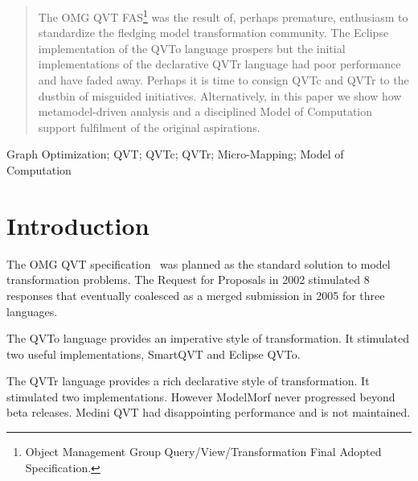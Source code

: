 \documentclass[conference]{IEEEtran}
\begin{document}
\begin{abstract}
The OMG QVT FAS\footnote{Object Management Group Query/View/Transformation Final Adopted Specification.} was the result of, perhaps premature, enthusiasm to standardize the fledging model transformation community. The Eclipse implementation of the QVTo language prospers but the initial implementations of the declarative QVTr language had poor performance and have faded away. Perhaps it is time to consign QVTc and QVTr to the dustbin of misguided initiatives. Alternatively, in this paper we show how metamodel-driven analysis and a disciplined Model of Computation support fulfilment of the original aspirations.
\end{abstract}

\begin{IEEEkeywords}
Graph Optimization; QVT; QVTc; QVTr; Micro-Mapping; Model of Computation
\end{IEEEkeywords}



%
\IEEEpeerreviewmaketitle



\section{Introduction}

The OMG QVT specification~\cite{QVT-1.3} was planned as the standard solution to model transformation problems. The Request for Proposals in 2002 stimulated 8 responses that eventually coalesced as a merged submission in 2005 for three languages.

The QVTo language provides an imperative style of transformation. It stimulated two useful implementations, SmartQVT and Eclipse QVTo. %

The QVTr language provides a rich declarative style of transformation. It stimulated two implementations. However ModelMorf never progressed beyond beta releases. 
Medini QVT had disappointing performance and is not maintained.
\end{document}
